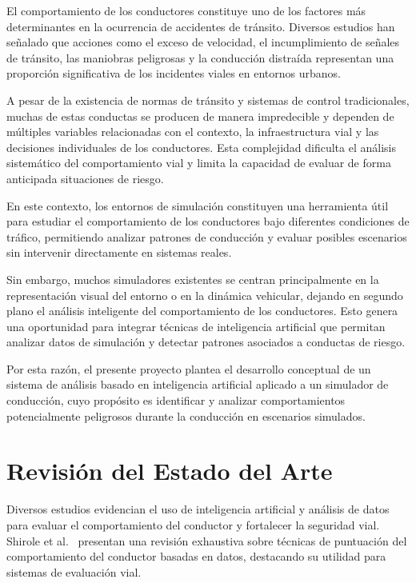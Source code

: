 \documentclass[12pt]{article}
\begin{document}
El comportamiento de los conductores constituye uno de los factores más determinantes en la ocurrencia de accidentes de tránsito. Diversos estudios han señalado que acciones como el exceso de velocidad, el incumplimiento de señales de tránsito, las maniobras peligrosas y la conducción distraída representan una proporción significativa de los incidentes viales en entornos urbanos.

A pesar de la existencia de normas de tránsito y sistemas de control tradicionales, muchas de estas conductas se producen de manera impredecible y dependen de múltiples variables relacionadas con el contexto, la infraestructura vial y las decisiones individuales de los conductores. Esta complejidad dificulta el análisis sistemático del comportamiento vial y limita la capacidad de evaluar de forma anticipada situaciones de riesgo.

En este contexto, los entornos de simulación constituyen una herramienta útil para estudiar el comportamiento de los conductores bajo diferentes condiciones de tráfico, permitiendo analizar patrones de conducción y evaluar posibles escenarios sin intervenir directamente en sistemas reales.

Sin embargo, muchos simuladores existentes se centran principalmente en la representación visual del entorno o en la dinámica vehicular, dejando en segundo plano el análisis inteligente del comportamiento de los conductores. Esto genera una oportunidad para integrar técnicas de inteligencia artificial que permitan analizar datos de simulación y detectar patrones asociados a conductas de riesgo.

Por esta razón, el presente proyecto plantea el desarrollo conceptual de un sistema de análisis basado en inteligencia artificial aplicado a un simulador de conducción, cuyo propósito es identificar y analizar comportamientos potencialmente peligrosos durante la conducción en escenarios simulados.
	\section{Revisión del Estado del Arte}
	Diversos estudios evidencian el uso de inteligencia artificial y análisis de datos para evaluar el comportamiento del conductor y fortalecer la seguridad vial.  
	Shirole et al.~\cite{Shirole2025} presentan una revisión exhaustiva sobre técnicas de puntuación del comportamiento del conductor basadas en datos, destacando su utilidad para sistemas de evaluación vial.
	
\end{document}
